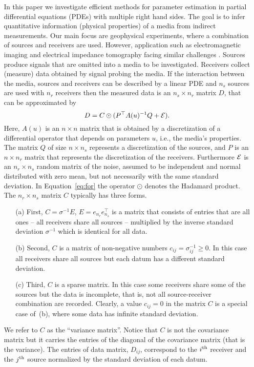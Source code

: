 \documentclass[12pt]{article}
\begin{document}
In this paper we investigate efficient methods for parameter estimation in partial differential equations (PDEs) with multiple right hand sides. The goal is to infer quantitative information (physical properties) of a media from indirect measurements. Our main focus are geophysical experiments, where a combination of sources and receivers are used. However, application such as electromagnetic imaging and electrical impedance tomography facing similar challenges \cite{smvoz,brocea,devony,na1,jc1}. Sources produce signals that are omitted into a media to be investigated. Receivers collect (measure) data obtained by signal probing the media. If the interaction between the media, sources and receivers can be described by a linear PDE and $n_{s}$ sources are used with $n_{r}$ receivers then the measured data is an $n_{s} \times n_r$ matrix $D$, that can be approximated by
\begin{equation}
\label{eq:for}
D = C \odot (P^{\top}A(u)^{-1}Q + {\cal E}).
\end{equation}
Here, $A(u)$ is an $n \times n$ matrix that is obtained by a discretization of a differential operator that depends on parameters $u$, i.e., the media's properties. The matrix $Q$ of size $n \times n_{s}$ represents a discretization of the sources, and $P$ is an $n \times n_{r}$ matrix that represents the discretization of the receivers. Furthermore $\cal E$ is an $n_{r} \times n_{s}$ random matrix of the noise, assumed to be independent  and normal distributed with zero mean, but not necessarily with the same standard deviation. In Equation~\eqref{eq:for} the operator $\odot$ denotes the Hadamard product. The $n_{r} \times n_{s}$ matrix $C$ typically has three forms.
\begin{itemize}
\item[(a)] First, $C = \sigma^{-1} E$,  $E=e_{n_r} e_{n_s}^{\top}$ is a matrix that consists of entries that are all ones -- all receivers share all sources -- multiplied by the inverse standard deviation $\sigma^{-1}$ which is identical for all data.

\item[(b)] Second, $C$ is a matrix of non-negative numbers $c_{ij} = \sigma_{ij}^{-1} \geq 0$. In this case all receivers share all sources but each datum has a different standard deviation.

\item[(c)] Third, $C$ is a sparse matrix. In this case some receivers share some of the sources but the data is incomplete, that is, not all source-receiver combination are recorded. Clearly, a value $c_{ij}=0$
in the matrix $C$ is a special case of~(b), where some data has infinite standard deviation.
\end{itemize}
We refer to $C$ as the ``variance matrix''. Notice that $C$ is not the covariance matrix but it carries the entries of the diagonal of the covariance matrix (that is the variance). The entries of data matrix, $D_{ij}$, correspond to the $i^{\rm th}$ receiver and the $j^{\rm th}$ source normalized by the standard deviation of each datum.
\end{document}
